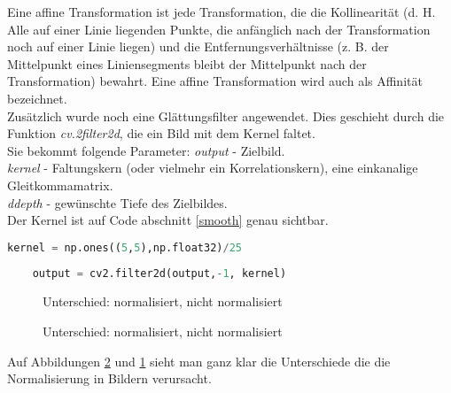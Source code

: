 	Eine affine Transformation ist jede Transformation, die die Kollinearität (d. H.
	Alle auf einer Linie liegenden Punkte, die anfänglich nach der Transformation
	noch auf einer Linie liegen) und die Entfernungsverhältnisse (z. B. der
	Mittelpunkt eines Liniensegments bleibt der Mittelpunkt nach der Transformation)
	bewahrt. 
	Eine affine Transformation wird auch als Affinität bezeichnet.\cite{affine}
	\\ 
	Zusätzlich wurde noch eine Glättungsfilter angewendet. Dies geschieht durch die
	Funktion \textit{cv.2filter2d}, die ein Bild mit dem Kernel faltet. \\
	Sie bekommt folgende Parameter: 
	\textit{output} - Zielbild.\\
	\textit{kernel} - Faltungskern (oder vielmehr ein Korrelationskern), eine
	einkanalige Gleitkommamatrix.\\
	\textit{ddepth} - gewünschte Tiefe des Zielbildes. \\
	
	Der Kernel ist auf Code abschnitt \ref{smooth} genau sichtbar. 
	
	\begin{lstlisting}[language=python,caption=Glättungsfilter,label=smooth]
	kernel = np.ones((5,5),np.float32)/25
	
	output = cv2.filter2d(output,-1, kernel)
	\end{lstlisting}
	
	\begin{figure}[H]
		\centering
		\qquad
		\caption{Unterschied: normalisiert, nicht normalisiert}
		\label{fig:norme}
		
	\end{figure}
	
	\begin{figure}[H]
		\centering
		\qquad
		\caption{Unterschied: normalisiert, nicht normalisiert}
		\label{fig:norm}
	\end{figure}
	
	
	Auf Abbildungen \ref{fig:norm} und \ref{fig:norme} sieht man ganz klar die
	Unterschiede die die Normalisierung in Bildern verursacht. 

